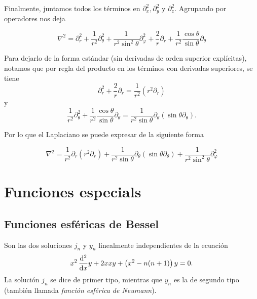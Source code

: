 \documentclass[11pt]{article}
\numberwithin{equation}{section}
\let\d\relax
\newcommand{\d}[1]{\,\frac{\mathrm{d}}{\mathrm{d}#1}}
\newcommand{\dd}[1]{\,\frac{\mathrm{d}^2}{\mathrm{d}#1}}
\begin{document}
Finalmente, juntamos todos los términos en \(\partial^2_x, \partial^2_y\) y
\(\partial^2_z\). Agrupando por operadores nos deja

\begin{equation}
\label{eq:laplaciano_esfericas_v1}
	\nabla^2
	=
	\partial^2_r
	+
	\frac{1}{r^2}
	\partial^2_{\theta}
	+
	\frac{1}{r^2 \sin^2\theta}
	\partial^2_{\varphi}
	+
	\frac{2}{r}
	\partial_{r}
	+
	\frac{1}{r^2} \frac{\cos\theta}{\sin\theta}
	\partial_{\theta}
\end{equation}

Para dejarlo de la forma estándar (sin derivadas de orden superior explícitas),
notamos que por regla del producto en los términos con derivadas superiores,
se tiene
\begin{equation}
	\partial^2_r + \frac{2}{r} \partial_{r}
	=
	\frac{1}{r^2} \left(r^2 \partial_{r}\right)
\end{equation}
y
\begin{equation}
	\frac{1}{r^2} \partial^2_{\theta} + \frac{1}{r^2} \frac{\cos\theta}{\sin\theta} \partial_{\theta}
	=
	\frac{1}{r^2\sin\theta} \partial_{\theta} \left(\sin\theta \partial_{\theta} \right)
.\end{equation}

Por lo que el Laplaciano se puede expresar de la siguiente forma

\begin{equation}
\label{eq:laplaciano_esfericas_v2}
	\nabla^2
	=
	\frac{1}{r^2} \partial_{r} \left(r^2 \partial_{r} \right)
	+
	\frac{1}{r^2\sin\theta} \partial_{\theta} \left(\sin\theta \partial_{\theta} \right)
	+
	\frac{1}{r^2\sin^2\theta} \partial^2_{\varphi}
\end{equation}

\section{Funciones especials}\label{ap:fn especiales}

\subsection{Funciones esféricas de Bessel}%
\label{ap:funciones especiales:bessel}

Son las dos soluciones \(j_n\) y \(y_n\) linealmente independientes de la ecuación
\begin{displaymath}
\label{eq:bessel:esfericas}
	x^2 \dd{x} y + 2x \d{x} y + \left(x^2 - n(n+1)\right) y = 0
.\end{displaymath}
La solución \(j_n\) se dice de primer tipo, mientras que \(y_n\) es la de
segundo tipo (también llamada \textit{función esférica de Neumann}).
\end{document}
